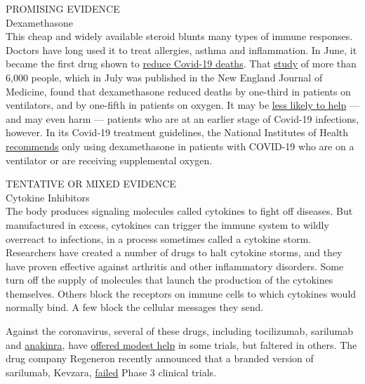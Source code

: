 PROMISING EVIDENCE\\
Dexamethasone\\
This cheap and widely available steroid blunts many types of immune
responses. Doctors have long used it to treat allergies, asthma and
inflammation. In June, it became the first drug shown to
\href{https://www.nytimes.com/2020/06/16/world/europe/dexamethasone-coronavirus-covid.html?searchResultPosition=5}{reduce
Covid-19 deaths}. That
\href{https://www.nejm.org/doi/full/10.1056/NEJMoa2021436?query=featured_home}{study}
of more than 6,000 people, which in July was published in the New
England Journal of Medicine, found that dexamethasone reduced deaths by
one-third in patients on ventilators, and by one-fifth in patients on
oxygen. It may be
\href{https://www.nytimes.com/2020/06/24/health/coronavirus-dexamethasone.html?searchResultPosition=2}{less
likely to help} --- and may even harm --- patients who are at an earlier
stage of Covid-19 infections, however. In its Covid-19 treatment
guidelines, the National Institutes of Health
\href{https://www.covid19treatmentguidelines.nih.gov/dexamethasone/}{recommends}
only using dexamethasone in patients with COVID-19 who are on a
ventilator or are receiving supplemental oxygen.

TENTATIVE OR MIXED EVIDENCE\\
Cytokine Inhibitors\\
The body produces signaling molecules called cytokines to fight off
diseases. But manufactured in excess, cytokines can trigger the immune
system to wildly overreact to infections, in a process sometimes called
a cytokine storm. Researchers have created a number of drugs to halt
cytokine storms, and they have proven effective against arthritis and
other inflammatory disorders. Some turn off the supply of molecules that
launch the production of the cytokines themselves. Others block the
receptors on immune cells to which cytokines would normally bind. A few
block the cellular messages they send.

Against the coronavirus, several of these drugs, including tocilizumab,
sarilumab and
\href{https://onlinelibrary.wiley.com/doi/10.1002/art.41422}{anakinra},
have
\href{https://www.medrxiv.org/content/10.1101/2020.06.01.20119149v2}{offered
modest help} in some trials, but faltered in others. The drug company
Regeneron recently announced that a branded version of sarilumab,
Kevzara,
\href{https://www.nytimes.com/reuters/2020/07/02/us/02reuters-health-coronavirus-regeneron-pharms.html}{failed}
Phase 3 clinical trials.

